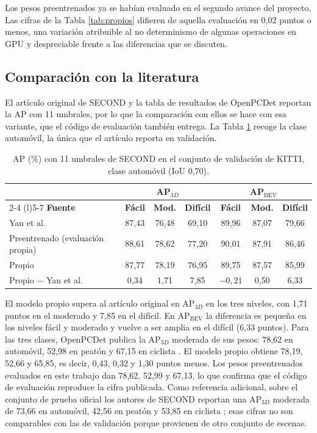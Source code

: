 \documentclass[11pt,letterpaper]{article}
\begin{document}
Los pesos preentrenados ya se habían evaluado en el segundo avance del proyecto. Las cifras de la Tabla \ref{tab:propios} difieren de aquella evaluación en 0,02 puntos o menos, una variación atribuible al no determinismo de algunas operaciones en GPU y despreciable frente a las diferencias que se discuten.

\subsection{Comparación con la literatura}

El artículo original de SECOND \cite{yan2018} y la tabla de resultados de OpenPCDet reportan la AP con 11 umbrales, por lo que la comparación con ellos se hace con esa variante, que el código de evaluación también entrega. La Tabla \ref{tab:literatura} recoge la clase automóvil, la única que el artículo reporta en validación.

\begin{table}[htbp]
\caption{AP (\%) con 11 umbrales de SECOND en el conjunto de validación de KITTI, clase automóvil (IoU 0,70).}
\label{tab:literatura}
\centering
\small
\begin{tabular}{@{}lcccccc@{}}
\toprule
 & \multicolumn{3}{c}{\textbf{AP$_{3D}$}} & \multicolumn{3}{c}{\textbf{AP$_{\text{BEV}}$}} \\
\cmidrule(lr){2-4} \cmidrule(l){5-7}
\textbf{Fuente} & \textbf{Fácil} & \textbf{Mod.} & \textbf{Difícil} & \textbf{Fácil} & \textbf{Mod.} & \textbf{Difícil} \\
\midrule
Yan et al.\ \cite{yan2018}          & 87,43 & 76,48 & 69,10 & 89,96 & 87,07 & 79,66 \\
Preentrenado (evaluación propia)    & 88,61 & 78,62 & 77,20 & 90,01 & 87,91 & 86,46 \\
Propio                              & 87,77 & 78,19 & 76,95 & 89,75 & 87,57 & 85,99 \\
\midrule
Propio $-$ Yan et al.               & 0,34 & 1,71 & 7,85 & $-0{,}21$ & 0,50 & 6,33 \\
\bottomrule
\end{tabular}
\end{table}

El modelo propio supera al artículo original en AP$_{3D}$ en los tres niveles, con 1,71 puntos en el moderado y 7,85 en el difícil. En AP$_{\text{BEV}}$ la diferencia es pequeña en los niveles fácil y moderado y vuelve a ser amplia en el difícil (6,33 puntos). Para las tres clases, OpenPCDet publica la AP$_{3D}$ moderada de sus pesos: 78,62 en automóvil, 52,98 en peatón y 67,15 en ciclista \cite{openpcdet}. El modelo propio obtiene 78,19, 52,66 y 65,85, es decir, 0,43, 0,32 y 1,30 puntos menos. Los pesos preentrenados evaluados en este trabajo dan 78,62, 52,99 y 67,13, lo que confirma que el código de evaluación reproduce la cifra publicada. Como referencia adicional, sobre el conjunto de prueba oficial los autores de SECOND reportan una AP$_{3D}$ moderada de 73,66 en automóvil, 42,56 en peatón y 53,85 en ciclista \cite{yan2018}; esas cifras no son comparables con las de validación porque provienen de otro conjunto de escenas.
\end{document}
